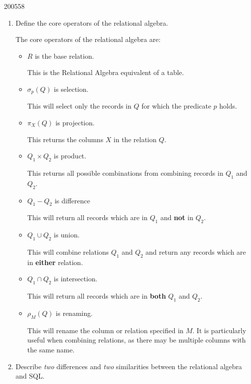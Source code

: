 \documentclass[10pt,\jkfside,a4paper]{article}
\begin{document}
\begin{examquestion}{2005}{5}{8}
\begin{enumerate}
\item{Define the core operators of the relational algebra.}

The core operators of the relational algebra are:
\begin{itemize}

\item $R$ is the base relation.

This is the Relational Algebra equivalent of a table.

\item $\sigma _p(Q)$ is selection.

This will select only the records in $Q$ for which the predicate $p$ holds.

\item $\pi _X(Q)$ is projection.

This returns the columns $X$ in the relation $Q$.

\item $Q_1\times Q_2$ is product.

This returns all possible combinations from combining records in $Q_1$ and $Q_2$.

\item $Q_1 - Q_2$ is difference

This will return all records which are in $Q_1$ and \textbf{not} in $Q_2$.

\item $Q_1\cup Q_2$ is union.

This will combine relations $Q_1$ and $Q_2$ and return any records which are in \textbf{either} relation.

\item $Q_1\cap Q_2$ is intersection.

This will return all records which are in \textbf{both} $Q_1$ and $Q_2$.

\item $\rho _M(Q)$ is renaming.

This will rename the column or relation specified in $M$.
It is particularly useful when combining relations, as there may be multiple columns with the same name.

\end{itemize}

\item{Describe \textit{two} differences and \textit{two} similarities between the relational algebra
and SQL.}


\end{enumerate}
\end{examquestion}
\end{document}
